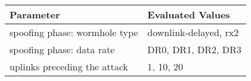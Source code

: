 \documentclass{standalone}
\begin{document}
\begin{tabular}{ll}
    \toprule
    Parameter & Evaluated Values \\
    \midrule
    spoofing phase: wormhole type & downlink-delayed, rx2 \\
    spoofing phase: data rate & DR0, DR1, DR2, DR3 \\
    uplinks preceding the attack & 1, 10, 20 \\
    \bottomrule
\end{tabular}
\end{document}

